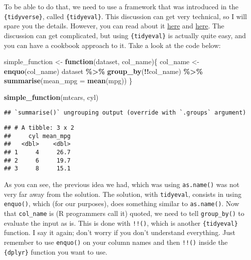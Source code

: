 \documentclass[
]{article}
\newenvironment{Shaded}{\begin{snugshade}}{\end{snugshade}}
\newcommand{\ControlFlowTok}[1]{\textcolor[rgb]{0.13,0.29,0.53}{\textbf{#1}}}
\newcommand{\DataTypeTok}[1]{\textcolor[rgb]{0.13,0.29,0.53}{#1}}
\newcommand{\KeywordTok}[1]{\textcolor[rgb]{0.13,0.29,0.53}{\textbf{#1}}}
\newcommand{\NormalTok}[1]{#1}
\newcommand{\OperatorTok}[1]{\textcolor[rgb]{0.81,0.36,0.00}{\textbf{#1}}}
\newcommand{\StringTok}[1]{\textcolor[rgb]{0.31,0.60,0.02}{#1}}
\begin{document}
To be able to do that, we need to use a framework that was introduced in the \texttt{\{tidyverse\}},
called \texttt{\{tidyeval\}}. This discussion can get very technical, so I will spare you the details.
However, you can read about it \href{http://dplyr.tidyverse.org/articles/programming.html}{here} and
\href{https://cran.r-project.org/web/packages/rlang/vignettes/tidy-evaluation.html}{here}. The
discussion can get complicated, but using \texttt{\{tidyeval\}} is actually quite easy, and you can have a
cookbook approach to it. Take a look at the code below:

\begin{Shaded}
\begin{Highlighting}[]
\NormalTok{simple\_function \textless{}{-}}\StringTok{ }\ControlFlowTok{function}\NormalTok{(dataset, col\_name)\{}
\NormalTok{  col\_name \textless{}{-}}\StringTok{ }\KeywordTok{enquo}\NormalTok{(col\_name)}
\NormalTok{  dataset }\OperatorTok{\%\textgreater{}\%}
\StringTok{    }\KeywordTok{group\_by}\NormalTok{(}\OperatorTok{!!}\NormalTok{col\_name) }\OperatorTok{\%\textgreater{}\%}
\StringTok{    }\KeywordTok{summarise}\NormalTok{(}\DataTypeTok{mean\_mpg =} \KeywordTok{mean}\NormalTok{(mpg))}
\NormalTok{\}}


\KeywordTok{simple\_function}\NormalTok{(mtcars, cyl)}
\end{Highlighting}
\end{Shaded}

\begin{verbatim}
## `summarise()` ungrouping output (override with `.groups` argument)
\end{verbatim}

\begin{verbatim}
## # A tibble: 3 x 2
##     cyl mean_mpg
##   <dbl>    <dbl>
## 1     4     26.7
## 2     6     19.7
## 3     8     15.1
\end{verbatim}

As you can see, the previous idea we had, which was using \texttt{as.name()} was not very far away from
the solution. The solution, with \texttt{tidyeval}, consists in using \texttt{enquo()}, which (for our purposes),
does something similar to \texttt{as.name()}. Now that
\texttt{col\_name} is (R programmers call it) quoted, we need to tell \texttt{group\_by()} to evaluate the input as
is. This is done with \texttt{!!()}, which is another \texttt{\{tidyeval\}} function. I say it again;
don't worry if you don't understand everything. Just remember to use \texttt{enquo()} on your column names
and then \texttt{!!()} inside the \texttt{\{dplyr\}} function you want to use.
\end{document}
